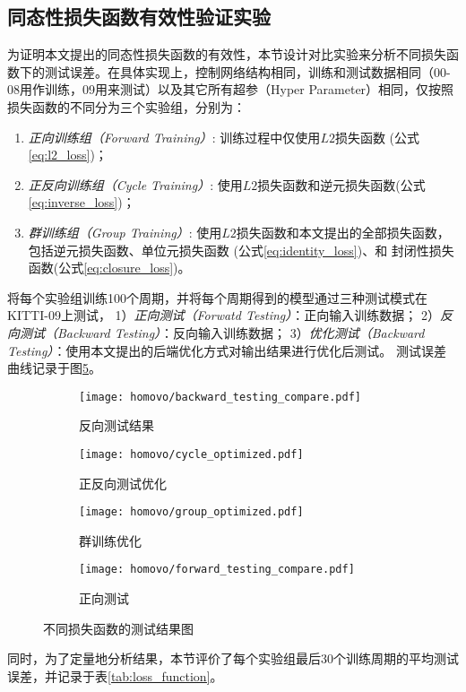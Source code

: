 \subsection{同态性损失函数有效性验证实验}
\label{sec:exp_homo}
为证明本文提出的同态性损失函数的有效性，本节设计对比实验来分析不同损失函数下的测试误差。在具体实现上，控制网络结构相同，训练和测试数据相同（00-08用作训练，09用来测试）以及其它所有超参（Hyper Parameter）相同，仅按照损失函数的不同分为三个实验组，分别为：
\begin{enumerate}
    \item \textit{正向训练组（Forward Training）}: 训练过程中仅使用$L2$损失函数 (公式\eqref{eq:l2_loss})； 
    \item \textit{正反向训练组（Cycle Training）}: 使用$L2$损失函数和逆元损失函数(公式\eqref{eq:inverse_loss})；
    \item \textit{群训练组（Group Training）}: 使用$L2$损失函数和本文提出的全部损失函数，包括逆元损失函数、单位元损失函数 (公式\eqref{eq:identity_loss})、和
    封闭性损失函数(公式\eqref{eq:closure_loss})。
\end{enumerate}
将每个实验组训练100个周期，并将每个周期得到的模型通过三种测试模式在KITTI-09上测试，
1）\textit{正向测试（Forwatd Testing）}：正向输入训练数据；
2）\textit{反向测试（Backward Testing）}：反向输入训练数据；
3）\textit{优化测试（Backward Testing）}：使用本文提出的后端优化方式对输出结果进行优化后测试。
测试误差曲线记录于图\ref{fig:homo_loss_compare}。
\begin{figure}[h]
    \centering
    \begin{subfigure}[b]{0.48\textwidth}
        \texttt{[image: homovo/backward\_testing\_compare.pdf]}
        \caption{反向测试结果}
        \label{fig:backward_testing}
    \end{subfigure}
    \vspace*{2mm}
    \begin{subfigure}[b]{0.48\textwidth}
        \texttt{[image: homovo/cycle\_optimized.pdf]}
        \caption{正反向测试优化}
        \label{fig:cycle_opti}
    \end{subfigure}
    \vspace*{2mm}
    \begin{subfigure}[b]{0.48\textwidth}
        \texttt{[image: homovo/group\_optimized.pdf]}
        \caption{群训练优化}
        \label{fig:group_opti}
    \end{subfigure}
    \begin{subfigure}[b]{0.48\textwidth}
        \texttt{[image: homovo/forward\_testing\_compare.pdf]}
        \caption{正向测试}
        \label{fig:forward_testing}
    \end{subfigure}
    \caption{不同损失函数的测试结果图}
    {\label{fig:homo_loss_compare}}
\end{figure}
同时，为了定量地分析结果，本节评价了每个实验组最后30个训练周期的平均测试误差，并记录于表\ref{tab:loss_function}。


